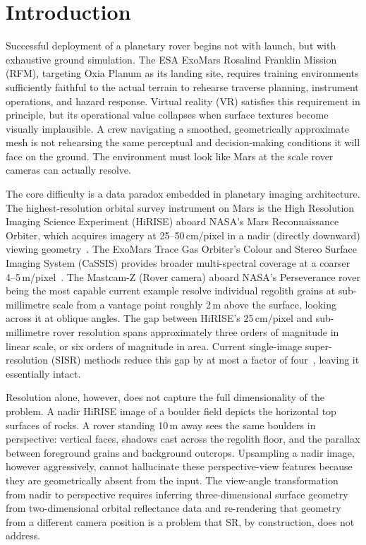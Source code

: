 \documentclass[10pt,journal]{IEEEtran}
\begin{document}
\section{Introduction}
\label{sec:intro}

Successful deployment of a planetary rover begins not with launch, but with
exhaustive ground simulation. The ESA ExoMars Rosalind Franklin Mission (RFM),
targeting Oxia Planum as its landing site, requires training environments
sufficiently faithful to the actual terrain to rehearse traverse planning,
instrument operations, and hazard response. Virtual reality (VR) satisfies this
requirement in principle, but its operational value collapses when surface
textures become visually implausible. A crew navigating a smoothed, geometrically
approximate mesh is not rehearsing the same perceptual and decision-making
conditions it will face on the ground. The environment must look like Mars at
the scale rover cameras can actually resolve.

The core difficulty is a data paradox embedded in planetary imaging architecture.
The highest-resolution orbital survey instrument on Mars is the High Resolution
Imaging Science Experiment (HiRISE) aboard NASA's Mars Reconnaissance Orbiter,
which acquires imagery at 25--50\,cm/pixel in a nadir (directly downward)
viewing geometry~\cite{tao2021madnet}. The ExoMars Trace Gas Orbiter's Colour
and Stereo Surface Imaging System (CaSSIS) provides broader multi-spectral
coverage at a coarser 4--5\,m/pixel~\cite{tao2021cassis}. The
Mastcam-Z (Rover camera) aboard NASA's Perseverance rover being the most capable current
example resolve individual regolith grains at sub-millimetre scale from a
vantage point roughly 2\,m above the surface, looking across it at oblique
angles. The gap between HiRISE's 25\,cm/pixel and sub-millimetre rover
resolution spans approximately three orders of magnitude in linear scale, or
six orders of magnitude in area. Current single-image super-resolution (SISR)
methods reduce this gap by at most a factor of four~\cite{tao2021cassis},
leaving it essentially intact.

Resolution alone, however, does not capture the full dimensionality of the
problem. A nadir HiRISE image of a boulder field depicts the horizontal top
surfaces of rocks. A rover standing 10\,m away sees the same boulders in
perspective: vertical faces, shadows cast across the regolith floor, and the
parallax between foreground grains and background outcrops. Upsampling a
nadir image, however aggressively, cannot hallucinate these perspective-view
features because they are geometrically absent from the input. The view-angle
transformation from nadir to perspective requires inferring three-dimensional
surface geometry from two-dimensional orbital reflectance data and re-rendering
that geometry from a different camera position is a problem that SR, by
construction, does not address.
\end{document}
